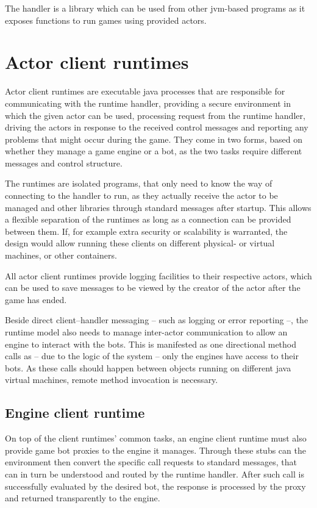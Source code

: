 \documentclass[11pt,a4paper,oneside]{report}
\begin{document}
	
	The handler is a library which can be used from other jvm-based programs as it exposes functions to run games using provided actors.
	
	\section{Actor client runtimes}
	
	Actor client runtimes are executable java processes that are responsible for communicating with the runtime handler, providing a secure environment in which the given actor can be used, processing request from the runtime handler, driving the actors in response to the received control messages and reporting any problems that might occur during the game.
	They come in two forms, based on whether they manage a game engine or a bot, as the two tasks require different messages and control structure.

	 The runtimes are isolated programs, that only need to know the way of connecting to the handler to run, as they actually receive the actor to be managed and other libraries through standard messages after startup. This allows a flexible separation of the runtimes as long as a connection can be provided between them. If, for example extra security or scalability is warranted, the design would allow running these clients on different physical- or virtual machines, or other containers.
	
	All actor client runtimes provide logging facilities to their respective actors, which can be used to save messages to be viewed by the creator of the actor after the game has ended.
	
	Beside direct client--handler messaging -- such as logging or error reporting --, the runtime model also needs to manage inter-actor communication to allow an engine to interact with the bots. This is manifested as one directional method calls as -- due to the logic of the system -- only the engines have access to their bots.
	As these calls should happen between objects running on different java virtual machines, remote method invocation is necessary.
	
		\subsection*{Engine client runtime}
	
		On top of the client runtimes' common tasks, an engine client runtime must also provide game bot proxies to the engine it manages. Through these stubs can the environment then convert the specific call requests to standard messages, that can in turn be understood and routed by the runtime handler. After such call is successfully evaluated by the desired bot, the response is processed by the proxy and returned transparently to the engine.
	
\end{document}
